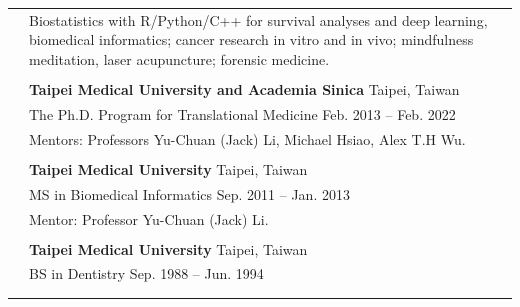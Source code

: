 \documentclass[letterpaper, 11pt]{article}
\begin{document}
\begin{longtable}{p{1.3in}p{4.8in}}


\nohyphens{\color{OliveGreen}{Research interests}}
& Biostatistics with R/Python/C++ for survival analyses and deep learning, biomedical informatics; cancer research in vitro and in vivo; mindfulness meditation, laser acupuncture; forensic medicine. \\
& \\


\color{OliveGreen}{Education} 
& \textbf{Taipei Medical University and Academia Sinica} \hfill Taipei, Taiwan \\ 
& The Ph.D. Program for  Translational Medicine \hfill Feb. 2013 -- Feb. 2022 \\
& Mentors: Professors Yu-Chuan (Jack) Li, Michael Hsiao, Alex T.H Wu. \\
& \\

& \textbf{Taipei Medical University} \hfill Taipei, Taiwan \\
& MS in Biomedical Informatics \hfill Sep. 2011 -- Jan. 2013\\
& Mentor: Professor Yu-Chuan (Jack) Li.\\ %
& \\

& \textbf{Taipei Medical University} \hfill Taipei, Taiwan \\
& BS in Dentistry \hfill Sep. 1988 -- Jun. 1994 \\
& \\%
& \\



\end{longtable}
\end{document}
